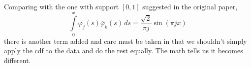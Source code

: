 \documentclass[11pt]{article}
\begin{document}
Comparing with the one with support $\left[0,1\right]$ suggested in the original paper,
\begin{equation}
  \int\limits_{0}^{x}\varphi_{j}\left(s\right)\overline{\varphi}_{k}\left(s\right)\,ds = \frac{\sqrt{2}}{\pi j}\sin\left(\pi j x\right)
\end{equation}
there is another term added and care must be taken in that we shouldn't simply apply the cdf to the data and do the rest equally. The math tells us it becomes different.
\end{document}
